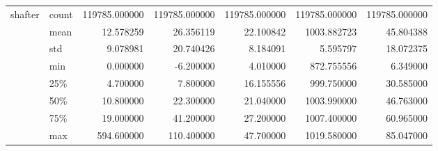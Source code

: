 \begin{tabular}{llrrrrr}
shafter & count &  119785.000000 &  119785.000000 &  119785.000000 &  119785.000000 &  119785.000000 \\
        & mean &      12.578259 &      26.356119 &      22.100842 &    1003.882723 &      45.804388 \\
        & std &       9.078981 &      20.740426 &       8.184091 &       5.595797 &      18.072375 \\
        & min &       0.000000 &      -6.200000 &       4.010000 &     872.755556 &       6.349000 \\
        & 25\% &       4.700000 &       7.800000 &      16.155556 &     999.750000 &      30.585000 \\
        & 50\% &      10.800000 &      22.300000 &      21.040000 &    1003.990000 &      46.763000 \\
        & 75\% &      19.000000 &      41.200000 &      27.200000 &    1007.400000 &      60.965000 \\
        & max &     594.600000 &     110.400000 &      47.700000 &    1019.580000 &      85.047000 \\
\bottomrule
\end{tabular}
